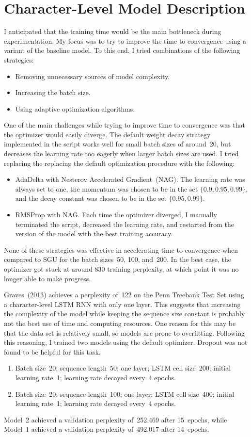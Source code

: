 \documentclass[11pt,a4paper]{article}
\begin{document}
\section{Character-Level Model Description}

I anticipated that the training time would be the main bottleneck during
experimentation. My focus was to try to improve the time to convergence using a
variant of the baseline model. To this end, I tried combinations of the
following strategies:
\begin{itemize}
\item Removing unnecessary sources of model complexity.
\item Increasing the batch size.
\item Using adaptive optimization algorithms.
\end{itemize}

One of the main challenges while trying to improve time to convergence was that
the optimizer would easily diverge. The default weight decay strategy
implemented in the script works well for small batch sizes of around~20, but
decreases the learning rate too eagerly when larger batch sizes are used. I
tried replacing the replacing the default optimization procedure with the
following:
\begin{itemize}
\item AdaDelta with Nesterov Accelerated Gradient~(NAG). The learning rate was
always set to one, the momentum was chosen to be in the set $\{0.9, 0.95,
0.99\}$, and the decay constant was chosen to be in the set $\{0.95, 0.99\}$.
\item RMSProp with NAG. Each time the optimizer diverged, I manually terminated
the script, decreased the learning rate, and restarted from the version of the
model with the best training accuracy.
\end{itemize}
None of these strategies was effective in accelerating time to convergence when
compared to SGU for the batch sizes~50, 100, and~200. In the best case, the
optimizer got stuck at around 830 training perplexity, at which point it was no
longer able to make progress.

Graves~(2013) achieves a perplexity of~122 on the Penn Treebank Test Set using a
character-level LSTM RNN with only one layer. This suggests that increasing the
complexity of the model while keeping the sequence size constant is probably not
the best use of time and computing resources. One reason for this may be that
the data set is relatively small, so models are prone to overfitting. Following
this reasoning, I trained two models using the default optimizer. Dropout was
not found to be helpful for this task.
\begin{enumerate}
\item Batch size~20; sequence length~50; one layer; LSTM cell size~200; initial
learning rate~1; learning rate decayed every~4 epochs.
\item Batch size~20; sequence length~100; one layer; LSTM cell size~400; initial
learning rate~1; learning rate decayed every~4 epochs.
\end{enumerate}
Model~2 achieved a validation perplexity of~252.469 after 15~epochs, while
Model~1 achieved a validation perplexity of~492.017 after 14~epochs.
\end{document}
